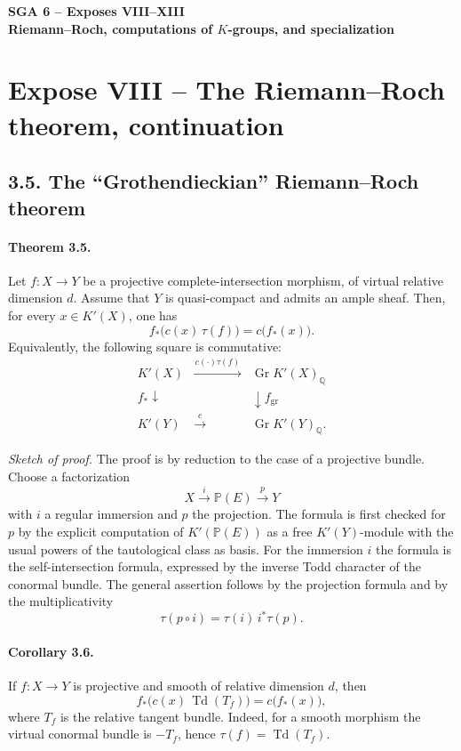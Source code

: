 \documentclass[12pt]{article}
\newcommand{\QQ}{\mathbb Q}
\newcommand{\bP}{\mathbb P}
\newcommand{\Gr}{\operatorname{Gr}}
\newcommand{\Todd}{\operatorname{Td}}
\newcommand{\xto}[1]{\xrightarrow{#1}}
\begin{document}
\begin{center}
{\Large\textbf{SGA 6 -- Exposes VIII--XIII}}\\[0.35em]
{\large\textbf{Riemann--Roch, computations of $K$-groups, and specialization}}
\end{center}

\section*{Expose VIII -- The Riemann--Roch theorem, continuation}

\subsection*{3.5. The ``Grothendieckian'' Riemann--Roch theorem}

\paragraph{Theorem 3.5.}
Let $f:X\to Y$ be a projective complete-intersection morphism, of virtual relative dimension $d$. Assume that $Y$ is quasi-compact and admits an ample sheaf. Then, for every $x\in K'(X)$, one has
\[
 f_*\bigl(c(x)\,\tau(f)\bigr)=c\bigl(f_*(x)\bigr).
\]
Equivalently, the following square is commutative:
\[
\begin{array}{ccc}
K'(X) & \xto{\,c(\cdot)\tau(f)\,} & \Gr K'(X)_\QQ \\
\scriptstyle f_*\downarrow && \downarrow\scriptstyle f_{\mathrm{gr}} \\
K'(Y) & \xto{\,c\,} & \Gr K'(Y)_\QQ .
\end{array}
\]

\emph{Sketch of proof.}
The proof is by reduction to the case of a projective bundle. Choose a factorization
\[
X\xto{i}\bP(E)\xto{p}Y
\]
with $i$ a regular immersion and $p$ the projection. The formula is first checked for $p$ by the explicit computation of $K'(\bP(E))$ as a free $K'(Y)$-module with the usual powers of the tautological class as basis. For the immersion $i$ the formula is the self-intersection formula, expressed by the inverse Todd character of the conormal bundle. The general assertion follows by the projection formula and by the multiplicativity
\[
\tau(p\circ i)=\tau(i)\,i^*\tau(p).
\]

\paragraph{Corollary 3.6.}
If $f:X\to Y$ is projective and smooth of relative dimension $d$, then
\[
 f_*\bigl(c(x)\,\Todd(T_f)\bigr)=c\bigl(f_*(x)\bigr),
\]
where $T_f$ is the relative tangent bundle. Indeed, for a smooth morphism the virtual conormal bundle is $-T_f$, hence $\tau(f)=\Todd(T_f)$.
\end{document}
